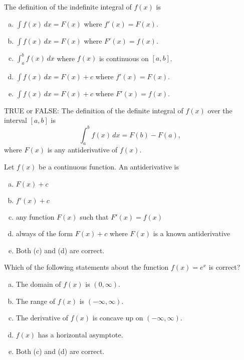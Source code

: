 \documentclass[12pt]{article}
\newcommand{\ds}{\displaystyle}
\newenvironment{problem}[2][Problem]{\begin{trivlist}
\item[\hskip \labelsep {\bfseries #1}\hskip \labelsep {\bfseries #2.}]}{\end{trivlist}}
\begin{document}
\newpage

\begin{problem}{16}
The definition of the indefinite integral of $f(x)$ is 
\begin{enumerate}[(a)]
  \item $\ds\int\! f(x)\, dx = F(x)$ where $f'(x) = F(x)$. 
  \item $\ds\int\! f(x)\, dx = F(x)$ where $F'(x) = f(x)$. 
  \item $\ds\int_{a}^{b}\! f(x)\, dx$ where $f(x)$ is continuous on $[a,b]$. 
  \item $\ds\int\! f(x)\, dx = F(x) + c$ where $f'(x) = F(x)$. 
  \item $\ds\int\! f(x)\, dx = F(x) + c$ where $F'(x) = f(x)$. 
\end{enumerate}
\end{problem}

\vspace{1in}

\begin{problem}{17}
TRUE or FALSE: The definition of the definite integral of $f(x)$ over the interval $[a,b]$ is 
$$
\int_{a}^{b}\! f(x)\, dx = F(b) - F(a), 
$$
where $F(x)$ is any antiderivative of $f(x)$. 
\end{problem}

\vspace{1in}

\begin{problem}{18}
Let $f(x)$ be a continuous function. An antiderivative is 
\begin{enumerate}[(a)]
  \item $F(x) + c$
  \item $f'(x) + c$
  \item any function $F(x)$ such that $F'(x) = f(x)$
  \item always of the form $F(x) + c$ where $F(x)$ is a known antiderivative
  \item Both (c) and (d) are correct. 
\end{enumerate}
\end{problem}

\newpage

\begin{problem}{19}
Which of the following statements about the function $f(x) = e^{x}$ is correct?
\begin{enumerate}[(a)]
  \item The domain of $f(x)$ is $(0,\infty)$. 
  \item The range of $f(x)$ is $(-\infty,\infty)$. 
  \item The derivative of $f(x)$ is concave up on $(-\infty,\infty)$. 
  \item $f(x)$ has a horizontal asymptote. 
  \item Both (c) and (d) are correct. 
\end{enumerate}
\end{problem}
\end{document}
